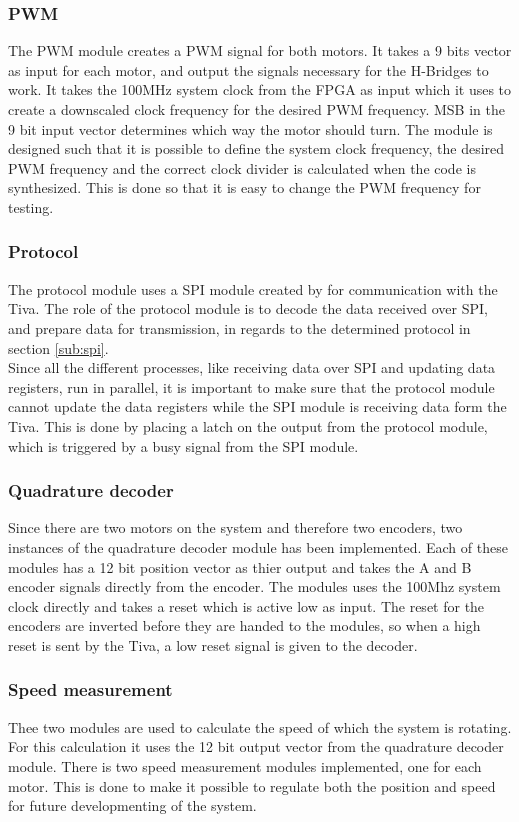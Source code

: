 \documentclass[../../../main]{subfiles}
\begin{document}
\subsubsection{PWM}
The PWM module creates a PWM signal for both motors. It takes a 9 bits vector as input for each motor, and output the signals necessary for the H-Bridges to work.
It takes the 100MHz system clock from the FPGA as input which it uses to create a downscaled clock frequency for the desired PWM frequency.
MSB in the 9 bit input vector determines which way the motor should turn.
The module is designed such that it is possible to define the system clock frequency, the desired PWM frequency and the correct clock divider is calculated when the code is synthesized.
This is done so that it is easy to change the PWM frequency for testing.
\subsubsection{Protocol}
The protocol module uses a SPI module created by  for communication with the Tiva.
The role of the protocol module is to decode the data received over SPI, and prepare data for transmission, in regards to the determined protocol in section \ref{sub:spi}.
\\
Since all the different processes, like receiving data over SPI and updating data registers, run in parallel, it is important to make sure that the protocol module cannot update the data registers while the SPI module is receiving data form the Tiva.
This is done by placing a latch on the output from the protocol module, which is triggered by a busy signal from the SPI module.

\subsubsection{Quadrature decoder}
\label{subsubsec:Qdecoder_implement}
Since there are two motors on the system and therefore two encoders, two instances of the quadrature decoder module has been implemented.
Each of these modules has a 12 bit position vector as thier output and takes the A and B encoder signals directly from the encoder. The modules uses the 100Mhz system clock directly and takes a reset which is active low as input.
The reset for the encoders are inverted before they are handed to the modules, so when a high reset is sent by the Tiva, a low reset signal is given to the decoder.


\subsubsection{Speed measurement}
Thee two modules are used to calculate the speed of which the system is rotating. For this calculation it uses the 12 bit output vector from the quadrature decoder module.
There is two speed measurement modules implemented, one for each motor.
This is done to make it possible to regulate both the position and speed for future developmenting of the system.
\end{document}
